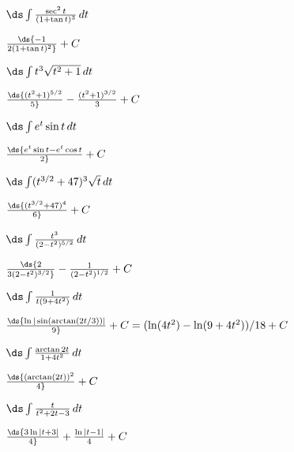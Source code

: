 \begin{enumialphparenastyle}
\begin{ex}	%
 $\ds\int {\sec^2t\over (1+\tan t)^3}\,dt$
\begin{sol}
 $\ds{-1\over 2(1+\tan t)^2}+C$
\end{sol}
\end{ex}

\begin{ex}	%
 $\ds\int t^3\sqrt{t^2+1}\,dt$
\begin{sol}
 $\ds{(t^2+1)^{5/2}\over 5}-{(t^2+1)^{3/2}\over 3}+C$
\end{sol}
\end{ex}

\begin{ex}	%
 $\ds\int e^t\sin t\,dt$
\begin{sol}
 $\ds{e^t\sin t-e^t\cos t\over 2}+C$
\end{sol}
\end{ex}

\begin{ex}	%
 $\ds\int (t^{3/2}+47)^3\sqrt{t}\,dt$
\begin{sol}
 $\ds{(t^{3/2}+47)^4\over6}+C$
\end{sol}
\end{ex}

\begin{ex}	%
 $\ds\int {t^3\over (2-t^2)^{5/2}}\,dt$
\begin{sol}
 $\ds{2\over 3(2-t^2)^{3/2}}-{1\over(2-t^2)^{1/2}}+C$
\end{sol}
\end{ex}

\begin{ex}	%
 $\ds\int {1\over t(9+4t^2)}\,dt$
\begin{sol}
 $\ds{\ln|\sin(\arctan(2t/3))|\over9}+C = 
(\ln(4t^2)-\ln(9+4t^2))/18 + C$
\end{sol}
\end{ex}

\begin{ex}	%
 $\ds\int {\arctan 2t\over 1+4t^2}\,dt$
\begin{sol}
 $\ds{(\arctan(2t))^2\over4}+C$
\end{sol}
\end{ex}

\begin{ex}	%
 $\ds\int {t\over t^2+2t-3}\,dt$
\begin{sol}
 $\ds{3\ln|t+3|\over 4}+{\ln|t-1|\over4}+C$
\end{sol}
\end{ex}


\end{enumialphparenastyle}
